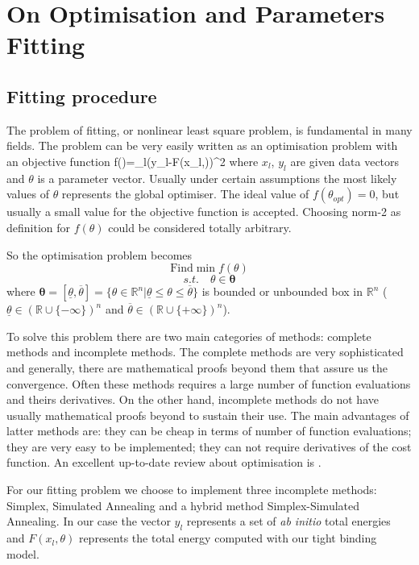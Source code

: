 \chapter{On Optimisation and Parameters Fitting}
\label{ch:three}
%
\section{Fitting procedure}
\par{The problem of fitting, or nonlinear least square problem, is fundamental in
many fields. The problem can be very easily written as an optimisation problem
with an objective function}
\be
f(\theta)=\sum_{l}(y_l-F(x_l,\theta))^2
\ee
where $x_l$, $y_l$ are given data vectors and $\theta$ is a parameter
vector. Usually under certain assumptions the most likely values of $\theta$
represents the global optimiser. The ideal value of $f(\theta_{opt})=0$, but
usually a small value for the objective function is accepted. Choosing norm-2
as definition for $f(\theta)$ could be considered totally arbitrary.
\par{So the optimisation problem becomes}
\begin{equation*}
\textrm{Find} \min f(\theta)
\end{equation*}
\begin{equation*}
s.t.\quad\theta\in\boldsymbol{\theta}
\end{equation*}
where
$\boldsymbol{\theta}=[\underline{\theta},\overline{\theta}]=\{\theta\in\mathbb{R}^n|\underline{\theta}\leq\theta\leq\overline{\theta}\}$
is bounded or unbounded box in $\mathbb{R}^n$
($\underline{\theta}\in(\mathbb{R}\cup\{-\infty\})^n$ and
$\overline{\theta}\in(\mathbb{R}\cup\{+\infty\})^n$).
\par{To solve this problem there are two main categories of methods: complete
methods and incomplete methods. The complete methods are very sophisticated and
generally, there are mathematical proofs beyond them that assure us the
convergence. Often these methods requires a large number of function
evaluations and theirs derivatives. On the other hand, incomplete methods do
not have usually mathematical proofs beyond to sustain their use. The main
advantages of latter methods are: they can be cheap in terms of number of
function evaluations; they are very easy to be implemented; they can not
require derivatives of the cost function. An excellent up-to-date review about
optimisation is \citep{Neumaier03}.}
\par{For our fitting problem we choose to implement three incomplete methods:
Simplex, Simulated Annealing and a hybrid method Simplex-Simulated
Annealing. In our case the vector $y_l$ represents a set of \emph{ab initio}
total energies and $F(x_l,\theta)$ represents the total energy computed with
our tight binding model.}
